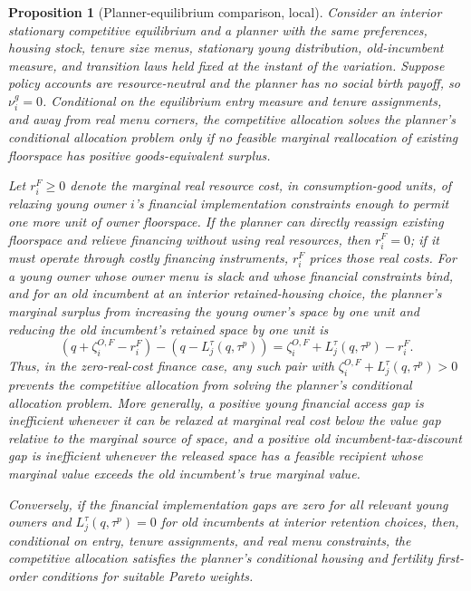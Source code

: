 \documentclass[11pt]{article}
\newtheorem{proposition}{Proposition}
\newcommand{\1}{\mathbf 1}
\begin{document}
\begin{proposition}[Planner-equilibrium comparison, local]
Consider an interior stationary competitive equilibrium and a planner with the same preferences, housing stock, tenure size menus, stationary young distribution, old-incumbent measure, and transition laws held fixed at the instant of the variation. Suppose policy accounts are resource-neutral and the planner has no social birth payoff, so $\nu_i^g=0$. Conditional on the equilibrium entry measure and tenure assignments, and away from real menu corners, the competitive allocation solves the planner's conditional allocation problem only if no feasible marginal reallocation of existing floorspace has positive goods-equivalent surplus.

Let $r_i^F\ge0$ denote the marginal real resource cost, in consumption-good units, of relaxing young owner $i$'s financial implementation constraints enough to permit one more unit of owner floorspace. If the planner can directly reassign existing floorspace and relieve financing without using real resources, then $r_i^F=0$; if it must operate through costly financing instruments, $r_i^F$ prices those real costs. For a young owner whose owner menu is slack and whose financial constraints bind, and for an old incumbent at an interior retained-housing choice, the planner's marginal surplus from increasing the young owner's space by one unit and reducing the old incumbent's retained space by one unit is
\[
\left(q+\zeta_i^{O,F}-r_i^F\right)
-
\left(q-L_j^\tau(q,\tau^p)\right)
=
\zeta_i^{O,F}+L_j^\tau(q,\tau^p)-r_i^F.
\]
Thus, in the zero-real-cost finance case, any such pair with $\zeta_i^{O,F}+L_j^\tau(q,\tau^p)>0$ prevents the competitive allocation from solving the planner's conditional allocation problem. More generally, a positive young financial access gap is inefficient whenever it can be relaxed at marginal real cost below the value gap relative to the marginal source of space, and a positive old incumbent-tax-discount gap is inefficient whenever the released space has a feasible recipient whose marginal value exceeds the old incumbent's true marginal value.

Conversely, if the financial implementation gaps are zero for all relevant young owners and $L_j^\tau(q,\tau^p)=0$ for old incumbents at interior retention choices, then, conditional on entry, tenure assignments, and real menu constraints, the competitive allocation satisfies the planner's conditional housing and fertility first-order conditions for suitable Pareto weights.
\end{proposition}
\end{document}
